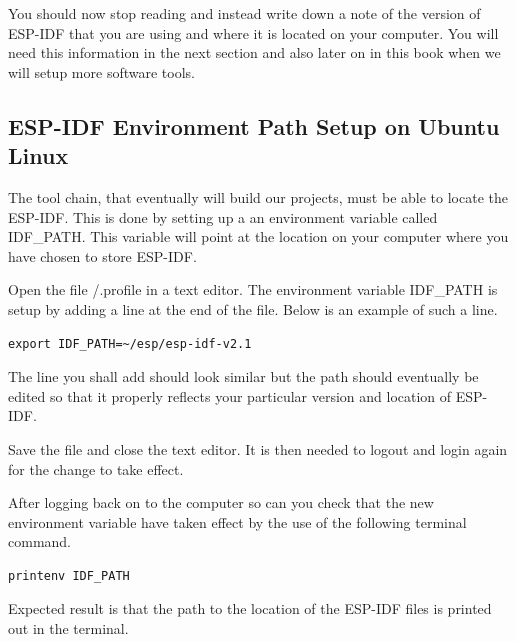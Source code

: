 \documentclass{tufte-book}
\begin{document}
You should now stop reading and instead write down a note of the version of ESP-IDF that you are using and where it is located on your computer. You will need this information in the next section and also later on in this book when we will setup more software tools.

\subsection{ESP-IDF Environment Path Setup on Ubuntu Linux}


The tool chain, that eventually will build our projects, must be able to locate the ESP-IDF. This is done by setting up a an environment variable called IDF\_PATH. This variable will point at the location on your computer where you have chosen to store ESP-IDF.

Open the file \texttildelow/.profile in a text editor. The environment variable IDF\_PATH is setup by adding a line at the end of the file. Below is an example of such a line.


\begin{lstlisting}
export IDF_PATH=~/esp/esp-idf-v2.1
\end{lstlisting}

The line you shall add should look similar but the path should  eventually be edited so that it properly reflects your particular version and location of ESP-IDF.

Save the file and close the text editor. It is then needed to logout and login again for the change to take effect.

After logging back on to the computer so can you check that the new environment variable have taken effect by the use of the following terminal command.

\begin{lstlisting}
printenv IDF_PATH
\end{lstlisting}

Expected result is that the path to the location of the ESP-IDF files is printed out in the terminal.\renewcommand{\textuparrow}{$\uparrow$}
\end{document}
